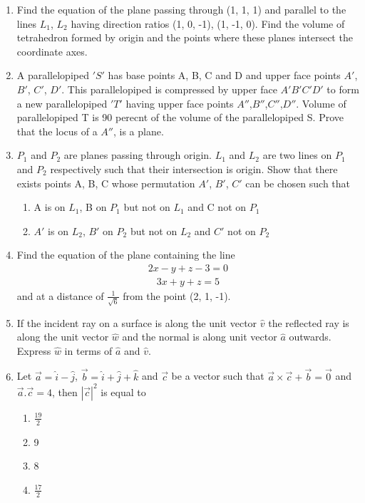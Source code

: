 \begin{enumerate}[label=\arabic*.,ref=\thesubsection.\theenumi]
\item Find the equation of the plane passing through (1, 1, 1) and parallel to the lines $L_1$, $L_2$ having direction ratios (1, 0, -1), (1, -1, 0). Find the volume of tetrahedron formed by origin and the points where these planes intersect the coordinate axes.

\item A parallelopiped $'S'$ has base points A, B, C and D and upper face points $A'$, $B'$, $C'$, $D'$. This parallelopiped is compressed by upper face $A'B'C'D'$ to form a new parallelopiped $'T'$ having upper face points $A''$,$B''$,$C''$,$D''$. Volume of parallelopiped T is 90 perecnt of the volume of the parallelopiped S. Prove that the locus of a $A''$, is a plane.

\item $P_1$ and $P_2$ are planes passing through origin. $L_1$ and $L_2$ are two lines on $P_1$ and $P_2$ respectively such that their intersection is origin. Show that there exists points A, B, C whose permutation $A'$, $B'$, $C'$ can be chosen such that
\begin{enumerate}
\item A is on $L_1$, B on $P_1$ but not on $L_1$ and C not on $P_1$
\item $A'$ is on $L_2$, $B'$ on $P_2$ but not on $L_2$ and $C'$ not on $P_2$
\end{enumerate} 

\item Find the equation of the plane containing the line
\begin{align*}
2x - y + z - 3 = 0
\end{align*}
\begin{align*}
3x + y + z = 5
\end{align*}
 and at a distance of $\frac{1}{\sqrt{6}}$ from the point (2, 1, -1).
 
\item If the incident ray on a surface is along the unit vector $\hat{v}$ the reflected ray is along the unit vector 
 $\hat{w}$ and the normal is along unit vector $\hat{a}$ outwards. Express $\hat{w}$ in terms of $\hat{a}$ and $\hat{v}$.
 
\item Let $\overrightarrow{a} = \hat{i} - \hat{j}$, $\overrightarrow{b} = \hat{i} + \hat{j} + \hat{k}$  and 
$\overrightarrow{c}$ be a vector such that $\overrightarrow{a} \times \overrightarrow{c} + \overrightarrow{b} = \overrightarrow{0}$ and $\overrightarrow{a}.\overrightarrow{c} = 4$, then $|\overrightarrow{c}|^2$ is equal to
\begin{enumerate}
\item $\frac{19}{2}$
\item 9
\item 8
\item $\frac{17}{2}$
\end{enumerate}


\end{enumerate}
